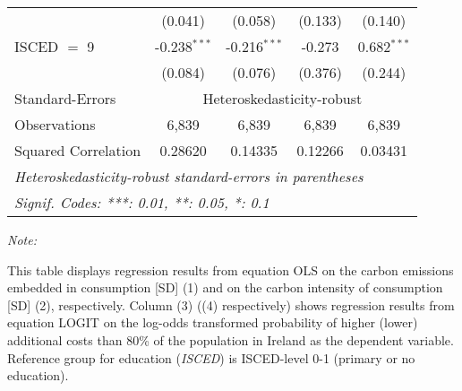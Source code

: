 \begin{table}[htbp!]
\begin{adjustbox}{width = 1\textwidth, max height = 0.95\textheight, center}
\begin{threeparttable}[b]
\begin{tabular}{lcccc}
                                 & (0.041)            & (0.058)            & (0.133)        & (0.140)\\   
            ISCED $=$ 9          & -0.238$^{***}$     & -0.216$^{***}$     & -0.273         & 0.682$^{***}$\\   
                                 & (0.084)            & (0.076)            & (0.376)        & (0.244)\\   
            \midrule 
            Standard-Errors & \multicolumn{4}{c}{Heteroskedasticity-robust} \\ 
            Observations         & 6,839              & 6,839              & 6,839          & 6,839\\  
            Squared Correlation  & 0.28620            & 0.14335            & 0.12266        & 0.03431\\  
            \midrule \midrule
            \multicolumn{5}{l}{\emph{Heteroskedasticity-robust standard-errors in parentheses}}\\
            \multicolumn{5}{l}{\emph{Signif. Codes: ***: 0.01, **: 0.05, *: 0.1}}\\
         \end{tabular}
         
         \begin{tablenotes}\item \medskip \textit{Note:}
            \item This table displays regression results from equation OLS on the carbon emissions embedded in consumption [SD] (1) and on the carbon intensity of consumption [SD] (2), respectively. 
                                      Column (3) ((4) respectively) shows regression results from equation LOGIT on the log-odds transformed probability of higher (lower) additional costs than 80\% of the population in Ireland as the dependent variable. Reference group for education (\textit{ISCED}) is ISCED-level 0-1 (primary or no education).
         \end{tablenotes}
      \end{threeparttable}
   \end{adjustbox}
\end{table}


